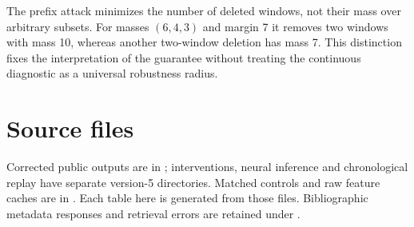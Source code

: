 \documentclass[preprint,12pt]{elsarticle}
\begin{document}
The prefix attack minimizes the number of deleted windows, not their mass over arbitrary subsets. For masses $(6,4,3)$ and margin 7 it removes two windows with mass 10, whereas another two-window deletion has mass 7. This distinction fixes the interpretation of the guarantee without treating the continuous diagnostic as a universal robustness radius.

\section*{Source files}
Corrected public outputs are in ; interventions, neural inference and chronological replay have separate version-5 directories. Matched controls and raw feature caches are in . Each table here is generated from those files. Bibliographic metadata responses and retrieval errors are retained under .
\end{document}
